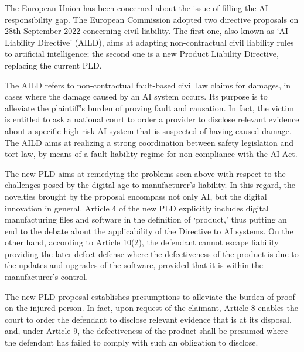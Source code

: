 The European Union has been concerned about the issue of filling the AI responsibility gap. The European Commission adopted two directive proposals on 28th September 2022 concerning civil liability. The first one, also known as ‘AI Liability Directive’ (AILD), aims at adapting non-contractual civil liability rules to artificial intelligence; the second one is a new Product Liability Directive, replacing the current PLD.

The AILD refers to non-contractual fault-based civil law claims for damages, in cases where the damage caused by an AI system occurs. Its purpose is to alleviate the plaintiff’s burden of proving fault and causation. In fact, the victim is entitled to ask a national court to order a provider to disclose relevant evidence about a specific high-risk AI system that is suspected of having caused damage. The AILD aims at realizing a strong coordination between safety legislation and tort law, by means of a fault liability regime for non-compliance with the \hyperref[sec:AIAct]{AI Act}.

The new PLD aims at remedying the problems seen above with respect to the challenges posed by the digital age to manufacturer’s liability. In this regard, the novelties brought by the proposal encompass not only AI, but the digital innovation in general. Article 4 of the new PLD explicitly includes digital manufacturing files and software in the definition of ‘product,’ thus putting an end to the debate about the applicability of the Directive to AI systems. On the other hand, according to Article 10(2), the defendant cannot escape liability providing the later-defect defense where the defectiveness of the product is due to the updates and upgrades of the software, provided that it is within the manufacturer’s control.

The new PLD proposal establishes presumptions to alleviate the burden of proof on the injured person. In fact, upon request of the claimant, Article 8 enables the court to order the defendant to disclose relevant evidence that is at its disposal, and, under Article 9, the defectiveness of the product shall be presumed where the defendant has failed to comply with such an obligation to disclose.


